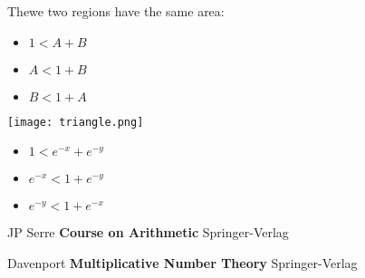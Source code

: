 \documentclass[12pt]{article}
\begin{document}
Thewe two regions have the same area:
\begin{itemize}
\item $1 < A + B$
\item $A < 1 + B$
\item $B < 1 + A$
\end{itemize}


\texttt{[image: triangle.png]}
\begin{itemize}
\item $1 < e^{-x} + e^{-y}$
\item $ e^{-x} < 1 +  e^{-y}$
\item $ e^{-y} < 1 +  e^{-x}$
\end{itemize}



\newpage

\selectfont \fontsize{12}{10}\selectfont

\begin{thebibliography}{}

\item JP Serre \textbf{Course on Arithmetic} Springer-Verlag

\item Davenport \textbf{Multiplicative Number Theory} Springer-Verlag



\end{thebibliography}
\end{document}
